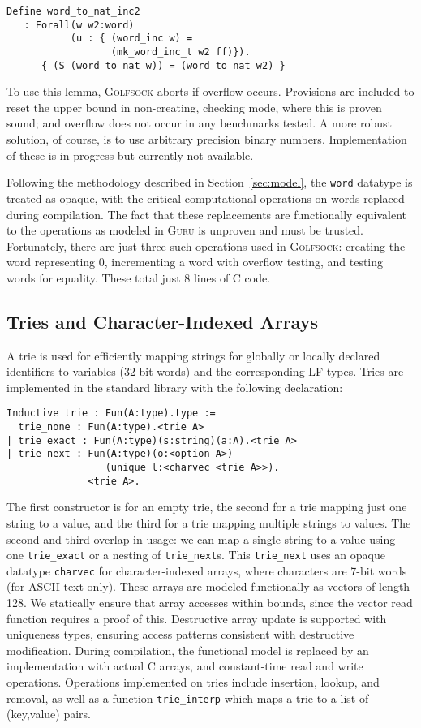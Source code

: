 \documentclass[preprint,natbib]{sigplanconf}
\begin{document}
\begin{verbatim}
Define word_to_nat_inc2
   : Forall(w w2:word)
           (u : { (word_inc w) = 
                  (mk_word_inc_t w2 ff)}).
      { (S (word_to_nat w)) = (word_to_nat w2) }
\end{verbatim}

\noindent To use this lemma, \textsc{Golfsock} aborts if overflow
occurs.  Provisions are included to reset the upper bound in
non-creating, checking mode, where this is proven sound; and overflow
does not occur in any benchmarks tested.  A more robust solution, of
course, is to use arbitrary precision binary numbers.  Implementation
of these is in progress but currently not available.

Following the methodology described in Section~\ref{sec:model}, the
\texttt{word} datatype is treated as opaque, with the critical
computational operations on words replaced during compilation.  The
fact that these replacements are functionally equivalent to the
operations as modeled in \textsc{Guru} is unproven and must be
trusted.  Fortunately, there are just three such operations used in
\textsc{Golfsock}: creating the word representing 0, incrementing a
word with overflow testing, and testing words for equality.  These
total just 8 lines of C code.

\subsection{Tries and Character-Indexed Arrays}

A trie is used for efficiently mapping strings for globally or locally
declared identifiers to variables (32-bit words) and the corresponding
LF types.  Tries are implemented in the standard library with the
following declaration:

\begin{verbatim}
Inductive trie : Fun(A:type).type :=
  trie_none : Fun(A:type).<trie A>
| trie_exact : Fun(A:type)(s:string)(a:A).<trie A>
| trie_next : Fun(A:type)(o:<option A>)
                 (unique l:<charvec <trie A>>). 
              <trie A>.
\end{verbatim}

\noindent The first constructor is for an empty trie, the second for a
trie mapping just one string to a value, and the third for a trie
mapping multiple strings to values.  The second and third overlap in
usage: we can map a single string to a value using one
\texttt{trie\_exact} or a nesting of \texttt{trie\_next}s.  This
\texttt{trie\_next} uses an opaque datatype \texttt{charvec} for
character-indexed arrays, where characters are 7-bit words (for ASCII
text only).  These arrays are modeled functionally as vectors of
length 128.  We statically ensure that array accesses within bounds,
since the vector read function requires a proof of this.  Destructive
array update is supported with uniqueness types, ensuring access
patterns consistent with destructive modification.  During
compilation, the functional model is replaced by an implementation
with actual C arrays, and constant-time read and write operations.
Operations implemented on tries include insertion, lookup, and
removal, as well as a function \texttt{trie\_interp} which maps a trie
to a list of (key,value) pairs.
\end{document}
